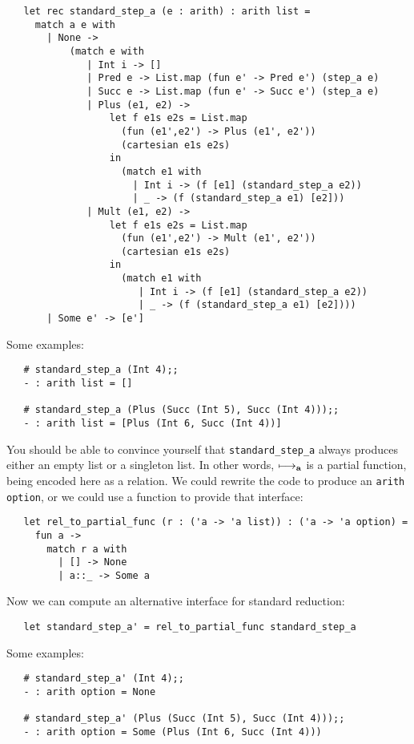 \begin{verbatim}
   let rec standard_step_a (e : arith) : arith list =
     match a e with
       | None ->
           (match e with
              | Int i -> []
              | Pred e -> List.map (fun e' -> Pred e') (step_a e)
              | Succ e -> List.map (fun e' -> Succ e') (step_a e)
              | Plus (e1, e2) -> 
                  let f e1s e2s = List.map
                    (fun (e1',e2') -> Plus (e1', e2'))
                    (cartesian e1s e2s)            
                  in
                    (match e1 with
                      | Int i -> (f [e1] (standard_step_a e2))
                      | _ -> (f (standard_step_a e1) [e2]))
              | Mult (e1, e2) ->
                  let f e1s e2s = List.map
                    (fun (e1',e2') -> Mult (e1', e2'))
                    (cartesian e1s e2s)
                  in
                    (match e1 with
                       | Int i -> (f [e1] (standard_step_a e2))
                       | _ -> (f (standard_step_a e1) [e2])))
       | Some e' -> [e']
\end{verbatim}

Some examples:
\begin{verbatim}
   # standard_step_a (Int 4);;
   - : arith list = []

   # standard_step_a (Plus (Succ (Int 5), Succ (Int 4)));;
   - : arith list = [Plus (Int 6, Succ (Int 4))]
\end{verbatim}

You should be able to convince yourself that {\tt standard\_step\_a}
always produces either an empty list or a singleton list.  In other
words, $\longmapsto_{\mathop{\mathbf{a}}}$ is a partial function, being encoded here as a
relation.  We could rewrite the code to produce an {\tt arith option},
or we could use a function to provide that interface:
\begin{verbatim}
   let rel_to_partial_func (r : ('a -> 'a list)) : ('a -> 'a option) =
     fun a ->
       match r a with
         | [] -> None
         | a::_ -> Some a
\end{verbatim}

Now we can compute an alternative interface for standard reduction:
\begin{verbatim}
   let standard_step_a' = rel_to_partial_func standard_step_a
\end{verbatim}

Some examples:
\begin{verbatim}
   # standard_step_a' (Int 4);;
   - : arith option = None

   # standard_step_a' (Plus (Succ (Int 5), Succ (Int 4)));;
   - : arith option = Some (Plus (Int 6, Succ (Int 4)))
\end{verbatim}



